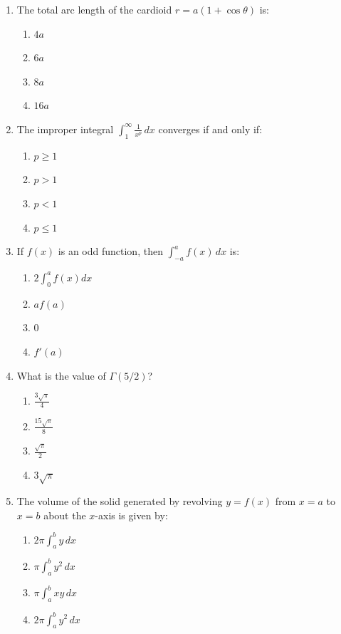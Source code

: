 \begin{enumerate}[leftmargin=1.5em]
    \item The total arc length of the cardioid $r = a(1+\cos\theta)$ is:
    \begin{enumerate}[label=(\alph*)]
        \item $4a$
        \item $6a$
        \item $8a$
        \item $16a$
    \end{enumerate}

    \item The improper integral $\int_1^\infty \frac{1}{x^p}\,dx$ converges if and only if:
    \begin{enumerate}[label=(\alph*)]
        \item $p \ge 1$
        \item $p > 1$
        \item $p < 1$
        \item $p \le 1$
    \end{enumerate}

    \item If $f(x)$ is an odd function, then $\int_{-a}^a f(x)\,dx$ is:
    \begin{enumerate}[label=(\alph*)]
        \item $2\int_0^a f(x)dx$
        \item $a f(a)$
        \item $0$
        \item $f'(a)$
    \end{enumerate}

    \item What is the value of $\Gamma(5/2)$?
    \begin{enumerate}[label=(\alph*)]
        \item $\frac{3\sqrt{\pi}}{4}$
        \item $\frac{15\sqrt{\pi}}{8}$
        \item $\frac{\sqrt{\pi}}{2}$
        \item $3\sqrt{\pi}$
    \end{enumerate}

    \item The volume of the solid generated by revolving $y = f(x)$ from $x=a$ to $x=b$ about the $x$-axis is given by:
    \begin{enumerate}[label=(\alph*)]
        \item $2\pi \int_a^b y\,dx$
        \item $\pi \int_a^b y^2\,dx$
        \item $\pi \int_a^b x y\,dx$
        \item $2\pi \int_a^b y^2\,dx$
    \end{enumerate}


\end{enumerate}
